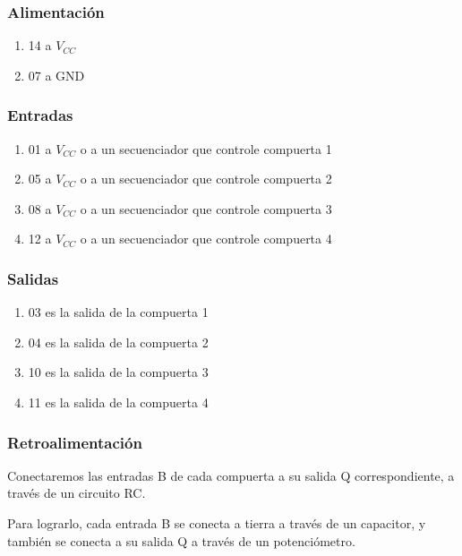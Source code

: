 \documentclass[../principal.tex]{subfiles}
\begin{document}
\subsubsection{Alimentación}

\begin{enumerate}
    \item 14 a $V_{CC}$
    \item 07 a GND
\end{enumerate}

\subsubsection{Entradas}

\begin{enumerate}
    \item 01 a $V_{CC}$ o a un secuenciador que controle compuerta 1
    \item 05 a $V_{CC}$ o a un secuenciador que controle compuerta 2
    \item 08 a $V_{CC}$ o a un secuenciador que controle compuerta 3
    \item 12 a $V_{CC}$ o a un secuenciador que controle compuerta 4
\end{enumerate}

\subsubsection{Salidas}

\begin{enumerate}
    \item 03 es la salida de la compuerta 1
    \item 04 es la salida de la compuerta 2
    \item 10 es la salida de la compuerta 3
    \item 11 es la salida de la compuerta 4
\end{enumerate}

\subsubsection{Retroalimentación}

Conectaremos las entradas B de cada compuerta a su salida Q correspondiente, a través de un circuito RC.

Para lograrlo, cada entrada B se conecta a tierra a través de un capacitor, y también se conecta a su salida Q a través de un potenciómetro.
\end{document}
